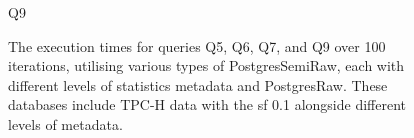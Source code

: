 \begin{figure}[h!]
\begin{minipage}[b]{0.45\linewidth}
    \caption*{Q9}
\end{minipage}
\caption[The execution times for queries Q5, Q6, Q7, and Q9 over 100 iterations]{The execution times for queries Q5, Q6, Q7, and Q9 over 100 iterations, utilising various types of PostgresSemiRaw, each with different levels of statistics metadata and PostgresRaw. These databases include TPC-H data with the \acrshort{sf} 0.1 alongside different levels of metadata.}
\label{fig:execution_time_stat_group2}
\end{figure}

